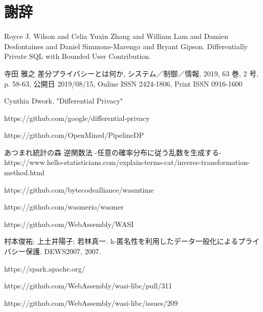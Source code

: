 \documentclass[a4paper,11pt]{jreport}
\begin{document}
\chapter*{謝辞}



\newpage

\renewcommand{\bibname}{参考文献}

%
%

\begin{thebibliography}{1}
    Royce J. Wilson and
    Celia Yuxin Zhang and
    William Lam and
    Damien Desfontaines and
    Daniel Simmons-Marengo and
    Bryant Gipson.
    \newblock Differentially Private SQL with Bounded User Contribution.

    寺田 雅之
    \newblock  差分プライバシーとは何か, システム／制御／情報, 2019, 63 巻, 2 号, p. 58-63, 公開日 2019/08/15, Online ISSN 2424-1806, Print ISSN 0916-1600

    Cynthia Dwork, "Differential Privacy"

    https://github.com/google/differential-privacy

    https://github.com/OpenMined/PipelineDP

    あつまれ統計の森
    \newblock 逆関数法 -任意の確率分布に従う乱数を生成する- https://www.hello-statisticians.com/explain-terms-cat/inverse-transformation-method.html

    https://github.com/bytecodealliance/wasmtime

    https://github.com/wasmerio/wasmer

    https://github.com/WebAssembly/WASI

    村本俊祐; 上土井陽子; 若林真一. k-匿名性を利用したデータ一般化によるプライバシー保護. DEWS2007, 2007.

    https://spark.apache.org/

    https://github.com/WebAssembly/wasi-libc/pull/311

    https://github.com/WebAssembly/wasi-libc/issues/209

\end{thebibliography}

\end{document}

